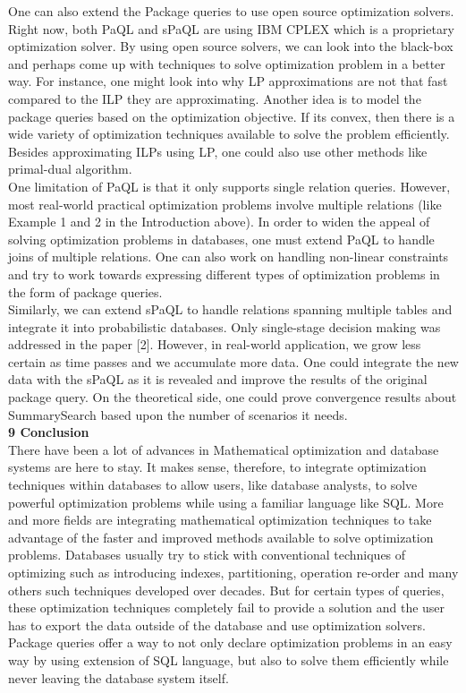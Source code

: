\documentclass[a4paper,12pt]{article}
\begin{document}
One can also extend the Package queries to use open source optimization solvers. Right now, both PaQL and sPaQL are using IBM CPLEX which is a proprietary optimization solver. By using open source solvers, we can look into the black-box and perhaps come up with techniques to solve optimization problem in a better way. For instance, one might look into why LP approximations are not that fast compared to the ILP they are approximating.  Another idea is to model the package queries based on the optimization objective. If its convex, then there is a wide variety of optimization techniques available to solve the problem efficiently. Besides approximating ILPs using LP, one could also use other methods like primal-dual algorithm. 
\\

One limitation of PaQL is that it only supports single relation queries. However, most real-world practical optimization problems involve multiple relations (like Example 1 and 2 in the Introduction above). In order to widen the appeal of solving optimization problems in databases, one must extend PaQL to handle joins of multiple relations. One can also work on handling non-linear constraints and try to work towards expressing different types of optimization problems in the form of package queries.
\\

Similarly, we can extend sPaQL to handle relations spanning multiple tables and integrate it into probabilistic databases. Only single-stage decision making was addressed in the paper [2]. However, in real-world application, we grow less certain as time passes and we accumulate more data. One could integrate the new data with the sPaQL as it is revealed and improve the results of the original package query. On the theoretical side, one could prove convergence results about SummarySearch based upon the number of scenarios it needs. 
\\

\textbf{9 Conclusion}
\\

There have been a lot of advances in Mathematical optimization and database systems are here to stay. It makes sense, therefore, to integrate optimization techniques within databases to allow users, like database analysts, to solve powerful optimization problems while using a familiar language like SQL.
More and more fields are integrating mathematical optimization techniques to take advantage of the faster and improved methods available to solve optimization problems. Databases usually try to stick with conventional techniques of optimizing such as introducing indexes, partitioning, operation re-order and many others such techniques developed over decades. But for certain types of queries, these optimization techniques completely fail to provide a solution and the user has to export the data outside of the database and use optimization solvers. Package queries offer a way to not only declare optimization problems in an easy way by using extension of SQL language, but also to solve them efficiently while never leaving the database system itself.
\\
\end{document}
